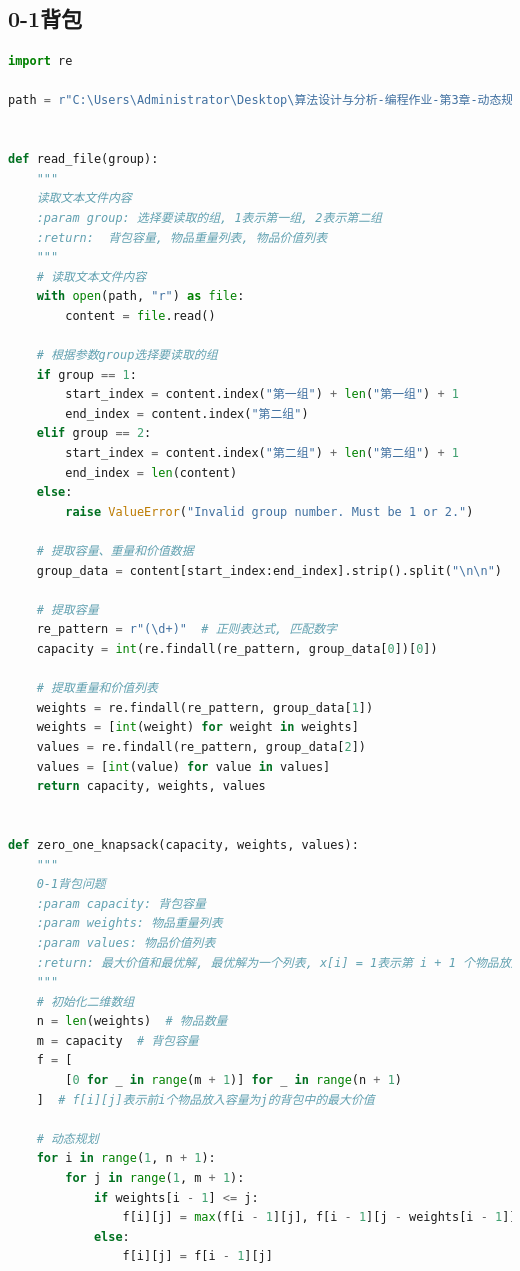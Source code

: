 \documentclass[lang=cn,11pt,a4paper]{elegantpaper}
\begin{document}
\subsection{0-1背包}

\begin{lstlisting}[language=python]
import re

path = r"C:\Users\Administrator\Desktop\算法设计与分析-编程作业-第3章-动态规划-2023-301-304\附件4.0-1背包问题输入数据-2023.txt"


def read_file(group):
    """
    读取文本文件内容
    :param group: 选择要读取的组, 1表示第一组, 2表示第二组
    :return:  背包容量, 物品重量列表, 物品价值列表
    """
    # 读取文本文件内容
    with open(path, "r") as file:
        content = file.read()

    # 根据参数group选择要读取的组
    if group == 1:
        start_index = content.index("第一组") + len("第一组") + 1
        end_index = content.index("第二组")
    elif group == 2:
        start_index = content.index("第二组") + len("第二组") + 1
        end_index = len(content)
    else:
        raise ValueError("Invalid group number. Must be 1 or 2.")

    # 提取容量、重量和价值数据
    group_data = content[start_index:end_index].strip().split("\n\n")

    # 提取容量
    re_pattern = r"(\d+)"  # 正则表达式, 匹配数字
    capacity = int(re.findall(re_pattern, group_data[0])[0])

    # 提取重量和价值列表
    weights = re.findall(re_pattern, group_data[1])
    weights = [int(weight) for weight in weights]
    values = re.findall(re_pattern, group_data[2])
    values = [int(value) for value in values]
    return capacity, weights, values


def zero_one_knapsack(capacity, weights, values):
    """
    0-1背包问题
    :param capacity: 背包容量
    :param weights: 物品重量列表
    :param values: 物品价值列表
    :return: 最大价值和最优解, 最优解为一个列表, x[i] = 1表示第 i + 1 个物品放入背包中
    """
    # 初始化二维数组
    n = len(weights)  # 物品数量
    m = capacity  # 背包容量
    f = [
        [0 for _ in range(m + 1)] for _ in range(n + 1)
    ]  # f[i][j]表示前i个物品放入容量为j的背包中的最大价值

    # 动态规划
    for i in range(1, n + 1):
        for j in range(1, m + 1):
            if weights[i - 1] <= j:
                f[i][j] = max(f[i - 1][j], f[i - 1][j - weights[i - 1]] + values[i - 1])
            else:
                f[i][j] = f[i - 1][j]


\end{lstlisting}
\end{document}

